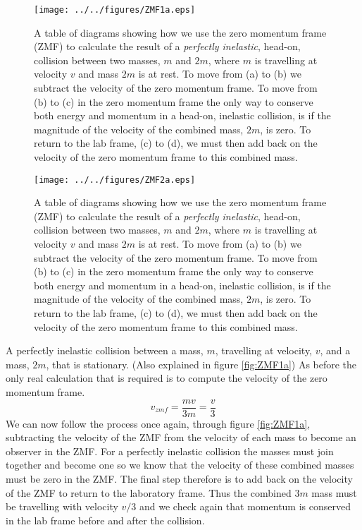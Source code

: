 \begin{wrapfigure}{r}{9.0cm}
\texttt{[image: ../../figures/ZMF1a.eps]}
\caption{A table of diagrams showing how we use the zero momentum frame (ZMF) to calculate the result of a {\it perfectly inelastic}, head-on, collision between two masses, $m$ and $2m$, where $m$ is travelling at velocity $v$ and mass $2m$ is at rest.  To move from (a) to (b) we subtract the velocity of the zero momentum frame.  To move from (b) to (c) in the zero momentum frame the only way to conserve both energy and momentum in a head-on, inelastic collision, is if the magnitude of the velocity of the combined mass, $2m$, is zero.  To return to the lab frame, (c) to (d), we must then add back on the velocity of the zero momentum frame to this combined mass.}\vspace{1.5cm}
\label{fig:ZMF1a}
\texttt{[image: ../../figures/ZMF2a.eps]}
\caption{A table of diagrams showing how we use the zero momentum frame (ZMF) to calculate the result of a {\it perfectly inelastic}, head-on, collision between two masses, $m$ and $2m$, where $m$ is travelling at velocity $v$ and mass $2m$ is at rest.  To move from (a) to (b) we subtract the velocity of the zero momentum frame.  To move from (b) to (c) in the zero momentum frame the only way to conserve both energy and momentum in a head-on, inelastic collision, is if the magnitude of the velocity of the combined mass, $2m$, is zero.  To return to the lab frame, (c) to (d), we must then add back on the velocity of the zero momentum frame to this combined mass.} \vspace{-1.0cm}
\label{fig:ZMF2a}
\end{wrapfigure}
 A perfectly inelastic collision between a mass, $m$, travelling at velocity, $v$, and a mass, $2m$, that is stationary. (Also explained in figure \ref{fig:ZMF1a})\nll
As before the only real calculation that is required is to compute the velocity of the zero momentum frame.
\begin{equation}
v_{zmf}=\frac{mv}{3m}=\frac{v}{3}
\end{equation}
We can now follow the process once again, through figure \ref{fig:ZMF1a}, subtracting the velocity of the ZMF from the velocity of each mass to become an observer in the ZMF.  For a perfectly inelastic collision the masses must join together and become one so we know that the velocity of these combined masses must be zero in the ZMF.  The final step therefore is to add back on the velocity of the ZMF to return to the laboratory frame.  Thus the combined $3m$ mass must be travelling with velocity $v/3$ and we check again that momentum is conserved in the lab frame before and after the collision.\\

